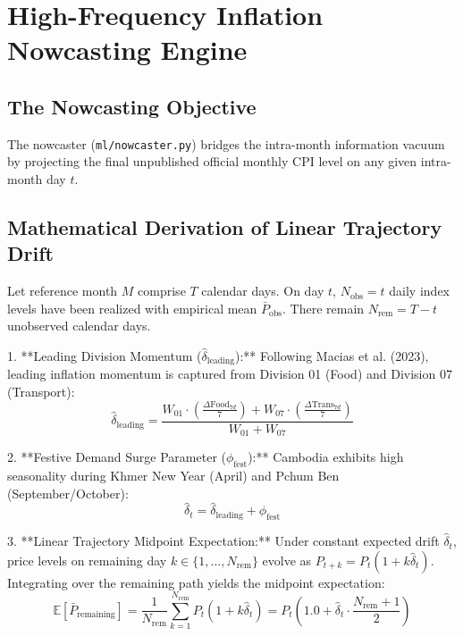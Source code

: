 \documentclass[11pt,a4paper]{article}
\begin{document}
\newpage

\section{High-Frequency Inflation Nowcasting Engine}

\subsection{The Nowcasting Objective}
The nowcaster (\texttt{ml/nowcaster.py}) bridges the intra-month information vacuum by projecting the final unpublished official monthly CPI level on any given intra-month day $t$.

\subsection{Mathematical Derivation of Linear Trajectory Drift}
Let reference month $M$ comprise $T$ calendar days. On day $t$, $N_{\text{obs}} = t$ daily index levels have been realized with empirical mean $\bar{P}_{\text{obs}}$. There remain $N_{\text{rem}} = T - t$ unobserved calendar days.

1. **Leading Division Momentum ($\hat{\delta}_{\text{leading}}$):**
Following Macias et al. (2023), leading inflation momentum is captured from Division 01 (Food) and Division 07 (Transport):
\begin{equation}
\hat{\delta}_{\text{leading}} = \frac{W_{01} \cdot \left(\frac{\Delta \text{Food}_{7d}}{7}\right) + W_{07} \cdot \left(\frac{\Delta \text{Trans}_{7d}}{7}\right)}{W_{01} + W_{07}}
\end{equation}

2. **Festive Demand Surge Parameter ($\phi_{\text{fest}}$):**
Cambodia exhibits high seasonality during Khmer New Year (April) and Pchum Ben (September/October):
\begin{equation}
\hat{\delta}_t = \hat{\delta}_{\text{leading}} + \phi_{\text{fest}}
\end{equation}

3. **Linear Trajectory Midpoint Expectation:**
Under constant expected drift $\hat{\delta}_t$, price levels on remaining day $k \in \{1, \dots, N_{\text{rem}}\}$ evolve as $P_{t+k} = P_t (1 + k \hat{\delta}_t)$. Integrating over the remaining path yields the midpoint expectation:
\begin{equation}
\mathbb{E}[\bar{P}_{\text{remaining}}] = \frac{1}{N_{\text{rem}}} \sum_{k=1}^{N_{\text{rem}}} P_t (1 + k \hat{\delta}_t) = P_t \left( 1.0 + \hat{\delta}_t \cdot \frac{N_{\text{rem}} + 1}{2} \right)
\end{equation}
\end{document}
